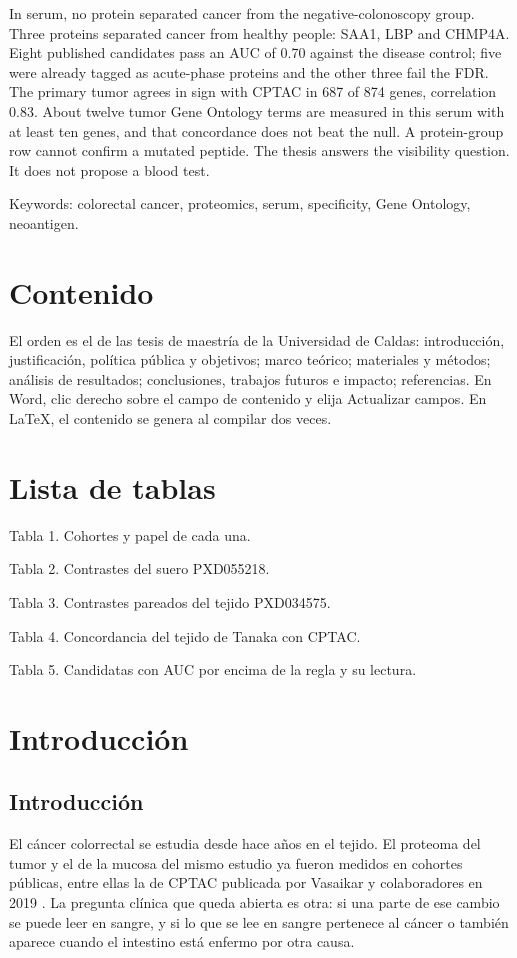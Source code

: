 \documentclass[12pt,oneside]{report}
\begin{document}
In serum, no protein separated cancer from the negative-colonoscopy group. Three proteins separated cancer from healthy people: SAA1, LBP and CHMP4A. Eight published candidates pass an AUC of 0.70 against the disease control; five were already tagged as acute-phase proteins and the other three fail the FDR. The primary tumor agrees in sign with CPTAC in 687 of 874 genes, correlation 0.83. About twelve tumor Gene Ontology terms are measured in this serum with at least ten genes, and that concordance does not beat the null. A protein-group row cannot confirm a mutated peptide. The thesis answers the visibility question. It does not propose a blood test.

Keywords: colorectal cancer, proteomics, serum, specificity, Gene Ontology, neoantigen.

\chapter*{Contenido}
El orden es el de las tesis de maestría de la Universidad de Caldas: introducción, justificación, política pública y objetivos; marco teórico; materiales y métodos; análisis de resultados; conclusiones, trabajos futuros e impacto; referencias. En Word, clic derecho sobre el campo de contenido y elija Actualizar campos. En LaTeX, el contenido se genera al compilar dos veces.

\chapter*{Lista de tablas}
Tabla 1. Cohortes y papel de cada una.

Tabla 2. Contrastes del suero PXD055218.

Tabla 3. Contrastes pareados del tejido PXD034575.

Tabla 4. Concordancia del tejido de Tanaka con CPTAC.

Tabla 5. Candidatas con AUC por encima de la regla y su lectura.

\chapter{Introducción}
\section{Introducción}
El cáncer colorrectal se estudia desde hace años en el tejido. El proteoma del tumor y el de la mucosa del mismo estudio ya fueron medidos en cohortes públicas, entre ellas la de CPTAC publicada por Vasaikar y colaboradores en 2019 \cite{vasaikar2019}. La pregunta clínica que queda abierta es otra: si una parte de ese cambio se puede leer en sangre, y si lo que se lee en sangre pertenece al cáncer o también aparece cuando el intestino está enfermo por otra causa.
\end{document}

